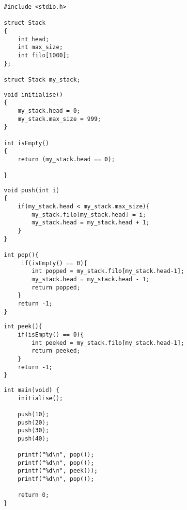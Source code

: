 \documentclass{beamer}
\begin{document}
\begin{frame}[fragile]
\begin{block}{}
\begin{lstlisting}
#include <stdio.h>

struct Stack
{
    int head;
    int max_size;
    int filo[1000];
};

struct Stack my_stack; 
\end{lstlisting}
\end{block}
\end{frame}

\begin{frame}[fragile]
\begin{block}{}
\begin{lstlisting}
void initialise()
{
    my_stack.head = 0;
    my_stack.max_size = 999;
}

int isEmpty()
{
    return (my_stack.head == 0);
    
}
\end{lstlisting}
\end{block}
\end{frame}

\begin{frame}[fragile]
\begin{block}{}
\begin{lstlisting}
void push(int i)
{
    if(my_stack.head < my_stack.max_size){
        my_stack.filo[my_stack.head] = i;
        my_stack.head = my_stack.head + 1;
    }
}

int pop(){
     if(isEmpty() == 0){
    	int popped = my_stack.filo[my_stack.head-1];
    	my_stack.head = my_stack.head - 1;
    	return popped;
    }
    return -1;
}
\end{lstlisting}
\end{block}
\end{frame}

\begin{frame}[fragile]
\begin{block}{}
\begin{lstlisting}
int peek(){
    if(isEmpty() == 0){
        int peeked = my_stack.filo[my_stack.head-1];
        return peeked;
    }
    return -1;
}
\end{lstlisting}
\end{block}
\end{frame}

\begin{frame}[fragile]
\begin{block}{}
\begin{lstlisting}
int main(void) {
    initialise();
	
    push(10);
    push(20);
    push(30);
    push(40);
	
    printf("%d\n", pop());
    printf("%d\n", pop());
    printf("%d\n", peek());
    printf("%d\n", pop());
	
    return 0;
}
\end{lstlisting}
\end{block}
\end{frame}
\end{document}
